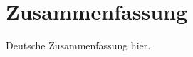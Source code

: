 \endgroup

\cleardoublepage%

\begingroup
\let\clearpage\relax
\let\cleardoublepage\relax
\let\cleardoublepage\relax

\chapter*{Zusammenfassung}

Deutsche Zusammenfassung hier.

\endgroup
\vfill










